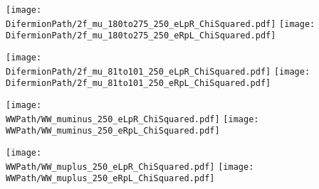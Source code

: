 

\newcommand{\BasePath}{/home/jakob/Documents/DESY/MountPoints/DUSTMount/TGCAnalysis/SampleProduction/NewMCProduction}
\newcommand{\DifermionPath}{\BasePath/2f_Z_l/PrEWInput/validation/plots/pdf/ChiSquared}
\newcommand{\WWPath}{\BasePath/4f_WW_sl/PrEWInput/validation/plots/pdf/ChiSquared}
\newcommand{\thirdfraction}{0.32}%
\newcommand{\alonefraction}{0.7}%
\newcommand{\halffraction}{0.48}%




\begin{frame}
\begin{center}
\texttt{[image: \\DifermionPath/2f\_mu\_180to275\_250\_eLpR\_ChiSquared.pdf]}
\texttt{[image: \\DifermionPath/2f\_mu\_180to275\_250\_eRpL\_ChiSquared.pdf]}
\end{center}
\end{frame}

\begin{frame}
\begin{center}
\texttt{[image: \\DifermionPath/2f\_mu\_81to101\_250\_eLpR\_ChiSquared.pdf]}
\texttt{[image: \\DifermionPath/2f\_mu\_81to101\_250\_eRpL\_ChiSquared.pdf]}
\end{center}
\end{frame}

\begin{frame}
\begin{center}
\texttt{[image: \\WWPath/WW\_muminus\_250\_eLpR\_ChiSquared.pdf]}
\texttt{[image: \\WWPath/WW\_muminus\_250\_eRpL\_ChiSquared.pdf]}
\end{center}
\end{frame}

\begin{frame}
\begin{center}
\texttt{[image: \\WWPath/WW\_muplus\_250\_eLpR\_ChiSquared.pdf]}
\texttt{[image: \\WWPath/WW\_muplus\_250\_eRpL\_ChiSquared.pdf]}
\end{center}
\end{frame}


